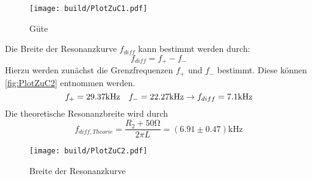 \begin{figure}
  \centering
  \texttt{[image: build/PlotZuC1.pdf]}
  \caption{Güte}
  \label{fig:PlotZuC1}
\end{figure}

Die Breite der Resonanzkurve $f_{diff}$ kann bestimmt werden durch:
\begin{equation}
  f_{diff} = f_+ - f_-
\end{equation}
Hierzu werden zunächst die Grenzfrequenzen $f_+$ und $f_-$ bestimmt. Diese können \autoref{fig:PlotZuC2} entnommen werden.
\begin{equation}
  f_+ = 29.37\unit{\kilo\hertz} \,\,\,\,\,\, f_- = 22.27\unit{\kilo\hertz} \\
  \rightarrow f_{diff} = 7.1 \unit{\kilo\hertz}
\end{equation}
Die theoretische Resonanzbreite wird durch
\begin{equation}
  f_{diff,Theorie} = \frac{R_2 +50\unit{\ohm}}{2\pi L} = \left(6.91 \pm 0.47\right)\unit{\kilo\hertz}
\end{equation}

\begin{figure}
  \centering
  \texttt{[image: build/PlotZuC2.pdf]}
  \caption{Breite der Resonanzkurve}
  \label{fig:PlotZuC2}
\end{figure}

